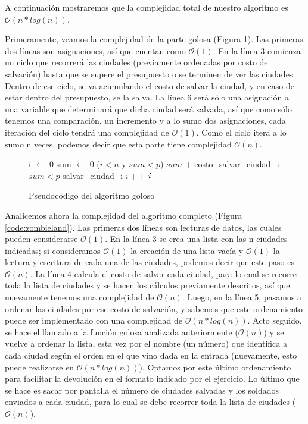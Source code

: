 \vspace*{0.3cm}

A continuación mostraremos que la complejidad total de nuestro algoritmo es $\mathcal{O}(n*log(n))$.

Primeramente, veamos la complejidad de la parte golosa (Figura \ref{code:goloso}).  Las primeras dos líneas son asignaciones, así que cuentan como $\mathcal{O}(1)$. En la línea 3 comienza un ciclo que recorrerá las ciudades (previamente ordenadas por costo de salvación) hasta que se supere el presupuesto o se terminen de ver las ciudades. Dentro de ese ciclo, se va acumulando el costo de salvar la ciudad, y en caso de estar dentro del presupuesto, se la salva.  La línea 6 será sólo una asignación a una variable que determinará que dicha ciudad será salvada, así que como sólo tenemos una comparación, un incremento y a lo sumo dos asignaciones, cada iteración del ciclo tendrá una complejidad de $\mathcal{O}(1)$.  Como el ciclo itera a lo sumo n veces, podemos decir que esta parte tiene complejidad $\mathcal{O}(n)$.

\begin{figure}[!ht]
\begin{codebox}
\li i $\leftarrow$ 0
\li sum $\leftarrow$ 0
\li \While ($i<n$ y $sum<p$) 
\li 		\Do   
		$sum$ + costo_salvar_ciudad_i   
\li		\If $sum<p$
\li 			\Then salvar_ciudad_i
\li				$i++$
			\End
	\End
\li \Return $\id{i}$       
\end{codebox} 
\caption{Pseudocódigo del algoritmo goloso}\label{code:goloso}
\end{figure}
\FloatBarrier

Analicemos ahora la complejidad del algoritmo completo (Figura \ref{code:zombieland}). Las primeras dos líneas son lecturas de datos, las cuales pueden considerarse $\mathcal{O}(1)$.  En la línea 3 se crea una lista con las n ciudades indicadas; si consideramos $\mathcal{O}(1)$ la creación de una lista vacía y $\mathcal{O}(1)$ la lectura y escritura de cada una de las ciudades, podemos decir que este paso es $\mathcal{O}(n)$.  La línea 4 calcula el costo de salvar cada ciudad, para lo cual se recorre toda la lista de ciudades y se hacen los cálculos previamente descritos, así que nuevamente tenemos una complejidad de $\mathcal{O}(n)$.  Luego, en la línea 5, pasamos a ordenar las ciudades por ese costo de salvación, y sabemos que este ordenamiento puede ser implementado con una complejidad de $\mathcal{O}(n*log(n))$. Acto seguido, se hace el llamado a la función golosa analizada anteriormente ($\mathcal{O}(n)$) y se vuelve a ordenar la lista, esta vez por el nombre (un número) que identifica a cada ciudad según el orden en el que vino dada en la entrada (nuevamente, esto puede realizarse en $\mathcal{O}(n*log(n))$). Optamos por este último ordenamiento para facilitar la devolución en el formato indicado por el ejercicio.  Lo último que se hace es sacar por pantalla el número de ciudades salvadas y los soldados enviados a cada ciudad, para lo cual se debe recorrer toda la lista de ciudades ($\mathcal{O}(n)$).

